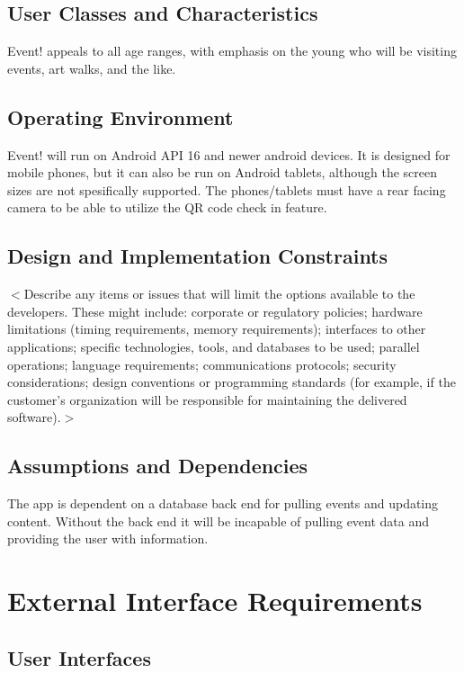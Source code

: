 \documentclass{scrreprt}
\begin{document}
\section{User Classes and Characteristics}
Event! appeals to all age ranges, with emphasis on the young who will be visiting 
events, art walks, and the like.

\section{Operating Environment}
Event! will run on Android API 16 and newer android devices. It is designed for 
mobile phones, but it can also be run on Android tablets, although the screen 
sizes are not spesifically supported. The phones/tablets must have a rear facing 
camera to be able to utilize the QR code check in feature.

\section{Design and Implementation Constraints}

$<$Describe any items or issues that will limit the options available to the 
developers. These might include: corporate or regulatory policies; hardware 
limitations (timing requirements, memory requirements); interfaces to other 
applications; specific technologies, tools, and databases to be used; parallel 
operations; language requirements; communications protocols; security 
considerations; design conventions or programming standards (for example, if the 
customer’s organization will be responsible for maintaining the delivered 
software).$>$

\section{Assumptions and Dependencies}
The app is dependent on a database back end for pulling events and updating 
content. Without the back end it will be incapable of pulling event data and 
providing the user with information.


\chapter{External Interface Requirements}

\section{User Interfaces}
\end{document}
